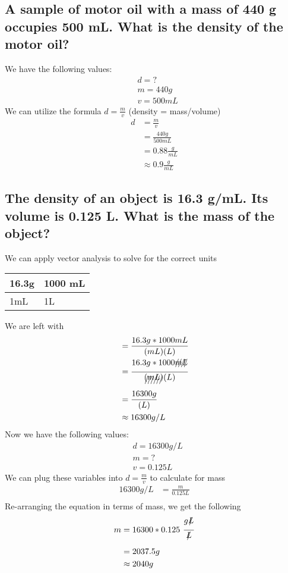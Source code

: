 \documentclass[11pt]{article}
\begin{document}
\subsection{A sample of motor oil with a mass of 440 g occupies 500 mL. What is the density of the motor oil?}
\label{sec:org4ee03ed}
We have the following values:
\begin{align*}
&d = ?\\
&m = 440g\\
&v = 500mL
\end{align*}
We can utilize the formula \(d=\frac{m}{v}\) (density = mass/volume)
\begin{align*}
d&=\frac{m}{v}\\
&=\frac{440g}{500mL}\\
&=0.88\frac{g}{mL}\\
&\approx0.9\frac{g}{mL}
\end{align*}

\subsection{The density of an object is 16.3 g/mL. Its volume is 0.125 L. What is the mass of the object?}
\label{sec:org520fb6f}
We can apply vector analysis to solve for the correct units
\begin{center}
\begin{tabular}{ll}
16.3g & 1000 mL\\
\hline
1mL & 1L\\
\end{tabular}
\end{center}
We are left with
\begin{align*}
&= \frac{16.3g * 1000mL}{(mL)(L)}\\
&= \frac{16.3g * 1000\xout{mL}}{\xout{(mL)}(L)}\\
&= \frac{16300g}{(L)}\\
&\approx 16300g/L
\end{align*}
Now we have the following values:
\begin{align*}
&d = 16300g/L\\
&m = ?\\
&v = 0.125L
\end{align*}
We can plug these variables into \(d=\frac{m}{v}\) to calculate for mass
\begin{align*}
16300{g}/{L} &=\frac{m}{0.125L}\\
\end{align*}
Re-arranging the equation in terms of mass, we get the following
\begin{align*}
m &= 16300 * 0.125\ \frac{g\xout{L}}{\xout{L}}\\
&= 2037.5g\\
&\approx 2040g
\end{align*}
\end{document}
